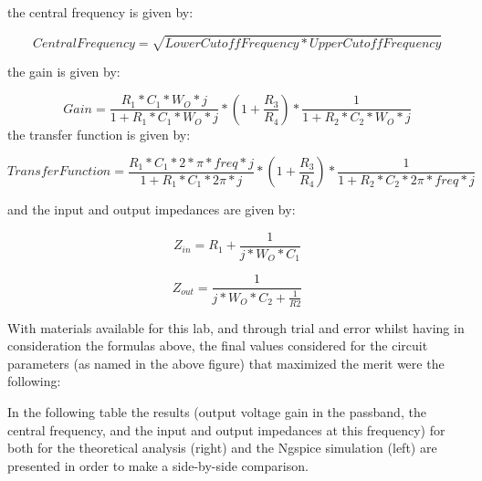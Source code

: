 the central frequency is given by:

\begin {equation}
	Central Frequency= \sqrt{Lower Cutoff Frequency * Upper Cutoff Frequency }  
	\label{eq:CentralF}
\end{equation} 
 
the gain is given by:

\begin {equation}
	Gain= \frac{R_1*C_1*W_O*j}{1+R_1*C_1*W_O*j}*(1+\frac{R_3}{R_4})*\frac{1}{1+R_2*C_2*W_O*j}   	
	\label{eq:gain}
\end{equation} 
the transfer function is given by: 

\begin {equation}
	Transfer Function= \frac{R_1*C_1*2*\pi*freq*j}{1+R_1*C_1*2\pi*j}*(1+\frac{R_3}{R_4})*\frac{1}{1+R_2*C_2*2\pi*freq*j}   	
	\label{eq:gain}
\end{equation} 

and the input and output impedances are given by: 

\begin {equation}
	Z_{in} = R_1 + \frac{1}{j*W_O*C_1} 
	\label{eq:impedances_in}
\end{equation}  

\begin {equation}
       Z_{out} = \frac{1}{j*W_O*C_2+\frac{1}{R2}}	
	\label{eq:impedances_out}
\end{equation}  


With materials available  for this lab, and through trial and error whilst having in consideration the formulas above, the final values considered for the circuit parameters (as named in the above figure) that maximized the merit were the following:

%    

In the following table the results (output voltage gain in the passband, the central frequency, and the input and output impedances at this frequency) for both for the theoretical analysis (right) and the Ngspice simulation (left) are presented in order to make a side-by-side comparison. \par

